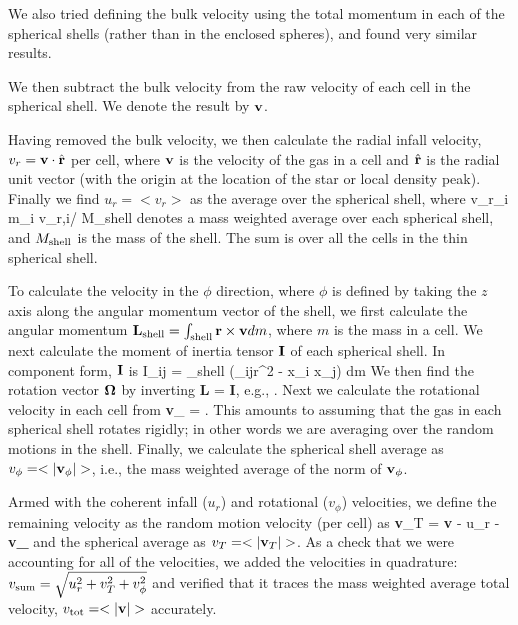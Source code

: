 \documentclass[../dissertation.tex]{subfiles}
\begin{document}
We also tried defining the bulk velocity using the total momentum in each of the spherical shells (rather than in the enclosed spheres), and found very similar results.

We then subtract the bulk velocity from the raw velocity of each cell in the spherical shell. We denote the result by ${\bf v}$.

Having removed the bulk velocity, we then calculate the radial infall velocity, $v_r = {\bf v}\cdot\hat{\bf r}$ per cell, where ${\bf v}$ is the velocity of the gas in a cell and $\hat{\bf r}$ is the radial unit vector (with the origin at the location of the star or local density peak).  Finally we find $u_r = <v_r>$ as the average over the spherical shell, where
%
\be 
\langle v_r\rangle \equiv \Sigma_i m_i v_{r,i}/ M_{\rm shell}
\ee
%
denotes a mass weighted average over each spherical shell, and $M_{\rm shell}$ is the mass of the shell. The sum is over all the cells in the thin spherical shell.

To calculate the velocity in the $\phi$ direction, where $\phi$ is defined by taking the $z$ axis along the angular momentum vector of the shell, we first calculate the angular momentum ${\bf L}_{\rm shell} = \int_{\rm shell} {\bf r} \times {\bf v} dm$, where $m$ is the mass in a cell. We next calculate the moment of inertia tensor ${\bf I}$ of each spherical shell.  In component form, ${\bf I}$ is
\be
I_{ij} = \int_{\rm shell} (\delta_{ij}r^2 - x_i x_j) dm
\label{eq:hydro_moment of inertia}
\ee
%
We then find the rotation vector ${\bf \Omega}$ by inverting
%
\be
{\bf L} = {\bf I}{\bf \Omega},
\ee
%
e.g., \citep{1992ApJ...399..551M}.
Next we calculate the rotational velocity in each cell from 
%
\be
{\bf v}_{\phi} = {\bf \Omega} .
\label{eq:hydro_calc v_phi}
\ee
%
This amounts to assuming that the gas in each spherical shell rotates rigidly; in other words we are averaging over the random motions in the shell. 
Finally, we calculate the spherical shell average as $v_{\phi} = <|{\bf v}_{\phi}|>$, i.e., the mass weighted average of the norm of ${\bf v}_{\phi}$.  

Armed with the coherent infall ($u_r$) and rotational ($v_{\phi}$) velocities, we define the remaining velocity as the random motion velocity (per cell) as 
\be
{\bf v}_T = {\bf v} - u_r - {\bf v_{\phi}}
\ee
and the spherical average as $v_T = <|{\bf v}_T|>$. 
As a check that we were accounting for all of the velocities, we added the velocities in quadrature: $v_{\rm sum} = \sqrt{u_r^2 + v_T^2 + v_{\phi}^2}$ and verified that it traces the mass weighted average total velocity, $v_{\rm tot} = <|{\bf v}|>$ accurately.
\end{document}
